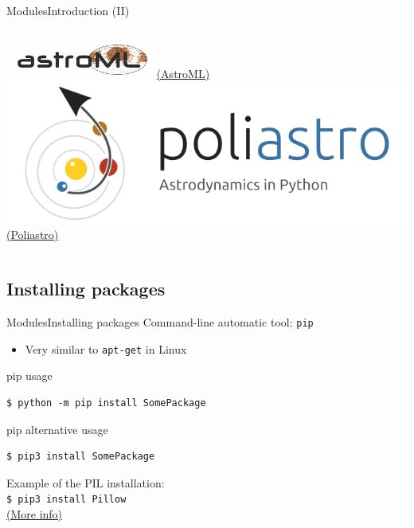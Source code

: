 \documentclass[10pt,compress]{beamer} %
\begin{document}
{\begin{frame}{Modules}{Introduction (II)}
    \begin{columns}
            \centering \includegraphics[width=\linewidth]{figs/astroml.png}
            \href{https://www.astroml.org/}{(AstroML)}
            \centering \includegraphics[width=\linewidth]{figs/poliastro.png}
            \href{https://docs.poliastro.space/en/stable/index.html}{(Poliastro)}
    \end{columns}
\end{frame}

}{}

\subsection{Installing packages}
\begin{frame}[fragile]{Modules}{Installing packages}
	Command-line automatic tool: \texttt{pip} 
		\begin{itemize}
			\item Very similar to \texttt{apt-get} in Linux
		\end{itemize}

	\begin{block}{pip usage}
	\begin{verbatim}
$ python -m pip install SomePackage
\end{verbatim}
	\end{block}

	\begin{block}{pip alternative usage}
	\begin{verbatim}
$ pip3 install SomePackage
\end{verbatim}
	\end{block}
	Example of the PIL  installation:\\
	\texttt{\$ pip3 install Pillow}\\
    \href{http://recursospython.com/guias-y-manuales/instalacion-y-utilizacion-de-pip-en-windows-linux-y-os-x/}{(More info)}
\end{frame}
\end{document}
